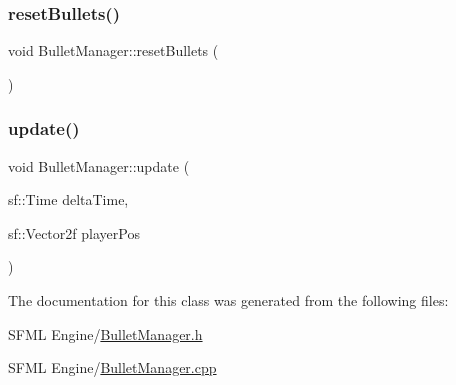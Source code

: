 \subsubsection{\texorpdfstring{reset\+Bullets()}{resetBullets()}}
{\footnotesize\ttfamily void Bullet\+Manager\+::reset\+Bullets (\begin{DoxyParamCaption}{ }\end{DoxyParamCaption})}

\mbox{\label{class_bullet_manager_ad4a0ca5d80bc781ccc9af56b710839ba}} 
\subsubsection{\texorpdfstring{update()}{update()}}
{\footnotesize\ttfamily void Bullet\+Manager\+::update (\begin{DoxyParamCaption}\item[{sf\+::\+Time}]{delta\+Time,  }\item[{sf\+::\+Vector2f}]{player\+Pos }\end{DoxyParamCaption})}



The documentation for this class was generated from the following files\+:\begin{DoxyCompactItemize}
\item 
S\+F\+M\+L Engine/\hyperlink{_bullet_manager_8h}{Bullet\+Manager.\+h}\item 
S\+F\+M\+L Engine/\hyperlink{_bullet_manager_8cpp}{Bullet\+Manager.\+cpp}\end{DoxyCompactItemize}
